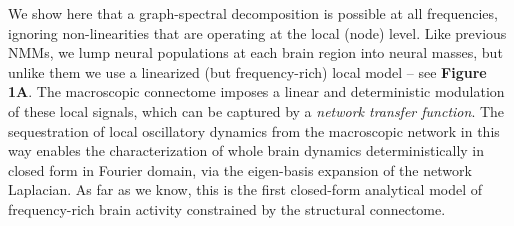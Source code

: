 We show here that a graph-spectral decomposition is possible at all
frequencies, ignoring non-linearities that are operating at the local
(node) level. Like previous NMMs, we lump neural populations at each
brain region into neural masses, but unlike them we use a linearized
(but frequency-rich) local model -- see \textbf{Figure 1A}. The
macroscopic connectome imposes a linear and deterministic modulation of
these local signals, which can be captured by a \emph{network transfer
function}. The sequestration of local oscillatory dynamics from the
macroscopic network in this way enables the characterization of whole
brain dynamics deterministically in closed form in Fourier domain, via
the eigen-basis expansion of the network Laplacian. As far as we know,
this is the first closed-form analytical model of frequency-rich brain
activity constrained by the structural connectome.



